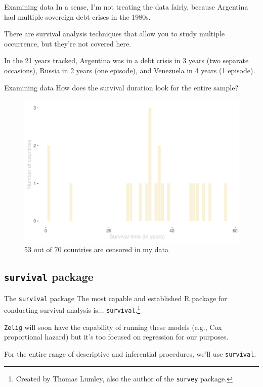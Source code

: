 \documentclass[12pt,english,pdf,xcolor=dvipsnames,aspectratio=169]{beamer}\usepackage[]{graphicx}\usepackage[]{xcolor}
\begin{document}
\begin{frame}{Examining data}
In a sense, I'm not treating the data fairly, because Argentina had multiple sovereign debt crises in the 1980s.\bigskip

There are survival analysis techniques that allow you to study multiple occurrence, but they're not covered here.\bigskip

In the 21 years tracked, Argentina was in a debt crisis in 3 years (two separate occasions), Russia in 2 years (one episode), and Venezuela in 4 years (1 episode).
\end{frame}

\begin{frame}{Examining data}
How does the survival duration look for the entire sample?



\begin{figure}
\centering
\includegraphics[scale=0.5]{../03-graphs/01-01}
\caption*{53 out of 70 countries are censored in my data}
\end{figure}
\end{frame}

\subsection{\texttt{survival} package}
\begin{frame}{The \texttt{survival} package}
The most capable and established R package for conducting survival analysis is... \texttt{survival}.\footnote{Created by Thomas Lumley, also the author of the \texttt{survey} package.}\bigskip

\texttt{Zelig} will soon have the capability of running these models (e.g., Cox proportional hazard) but it's too focused on regression for our purposes.\bigskip

For the entire range of descriptive and inferential procedures, we'll use \texttt{survival}.
\end{frame}
\end{document}
